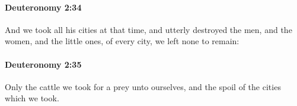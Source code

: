		\paragraph{Deuteronomy 2:34} %
			\label{DEUTERONOMY-2-34}

			And we took all his cities at that time, and utterly destroyed the men, and the women, and the little ones, of every city, we left none to remain:


		\paragraph{Deuteronomy 2:35} %
			\label{DEUTERONOMY-2-35}

			Only the cattle we took for a prey unto ourselves, and the spoil of the cities which we took.


